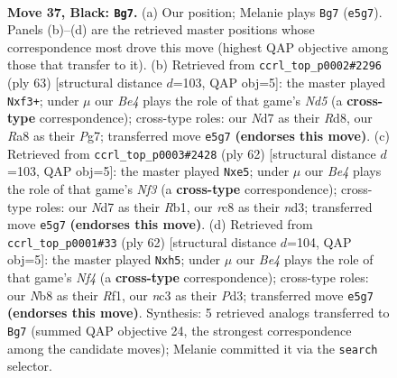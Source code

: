 \documentclass[11pt]{article}
\begin{document}
\clearpage

\begin{figure}[p]\centering
\begin{subfigure}{0.46\textwidth}\centering
\resizebox{\linewidth}{!}{%
\newchessgame
\chessboard[
  setfen={rnR5/3n1k1Q/p2p4/3Pb3/6P1/q1N5/4N3/4K3 b - - 5 37},
  showmover=false,
  pgfstyle=straightmove, color=movearrow, markmove={e5-g7}
]}
\caption{}
\end{subfigure}\hfill
\begin{subfigure}{0.46\textwidth}\centering
\resizebox{\linewidth}{!}{%
\newchessgame
\chessboard[
  setfen={3r3k/1Q4pp/2n5/5q2/P2n4/3p1N1P/3N1PPK/4R3 b - - 0 32},
  showmover=false,
  pgfstyle=straightmove, color=movearrow, markmove={d4-f3}
]}
\caption{}
\end{subfigure}
\\[4pt]
\begin{subfigure}{0.46\textwidth}\centering
\resizebox{\linewidth}{!}{%
\newchessgame
\chessboard[
  setfen={6k1/3pb1pp/8/3rn3/3N4/3nBNP1/1P3P2/1R4K1 w - - 10 32},
  showmover=false,
  pgfstyle=straightmove, color=movearrow, markmove={f3-e5}
]}
\caption{}
\end{subfigure}\hfill
\begin{subfigure}{0.46\textwidth}\centering
\resizebox{\linewidth}{!}{%
\newchessgame
\chessboard[
  setfen={1r4k1/5pb1/2qp4/4n2p/5N2/3PB3/6P1/3Q1R1K w - - 0 32},
  showmover=false,
  pgfstyle=straightmove, color=movearrow, markmove={f4-h5}
]}
\caption{}
\end{subfigure}
\caption{\textbf{Move 37, Black: \texttt{Bg7}.} (a) Our position; Melanie plays \texttt{Bg7} (\texttt{e5g7}). Panels (b)--(d) are the retrieved master positions whose correspondence most drove this move (highest QAP objective among those that transfer to it). (b) Retrieved from \texttt{ccrl\_top\_p0002\#2296} (ply 63) [structural distance $d$=103, QAP obj=5]: the master played \texttt{Nxf3+}; under $\mu$ our \emph{Be4} plays the role of that game's \emph{Nd5} (a \textbf{cross-type} correspondence); cross-type roles: our \emph{N}d7 as their \emph{R}d8, our \emph{R}a8 as their \emph{P}g7; transferred move \texttt{e5g7} \textbf{(endorses this move)}. (c) Retrieved from \texttt{ccrl\_top\_p0003\#2428} (ply 62) [structural distance $d$=103, QAP obj=5]: the master played \texttt{Nxe5}; under $\mu$ our \emph{Be4} plays the role of that game's \emph{Nf3} (a \textbf{cross-type} correspondence); cross-type roles: our \emph{N}d7 as their \emph{R}b1, our \emph{r}c8 as their \emph{n}d3; transferred move \texttt{e5g7} \textbf{(endorses this move)}. (d) Retrieved from \texttt{ccrl\_top\_p0001\#33} (ply 62) [structural distance $d$=104, QAP obj=5]: the master played \texttt{Nxh5}; under $\mu$ our \emph{Be4} plays the role of that game's \emph{Nf4} (a \textbf{cross-type} correspondence); cross-type roles: our \emph{N}b8 as their \emph{R}f1, our \emph{n}c3 as their \emph{P}d3; transferred move \texttt{e5g7} \textbf{(endorses this move)}. Synthesis: 5 retrieved analogs transferred to \texttt{Bg7} (summed QAP objective 24, the strongest correspondence among the candidate moves); Melanie committed it via the \texttt{search} selector.}
\label{fig:thought-m73}
\end{figure}
\end{document}
